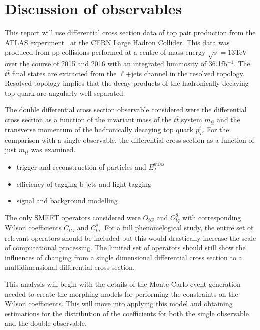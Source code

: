 \documentclass[a4paper,11pt]{article}
\begin{document}
\section{Discussion of observables}
This report will use differential cross section data of top pair production from the ATLAS experiment~\cite{ATLAS:2019hxz} at the CERN Large Hadron Collider.
This data was produced from pp collisions performed at a centre-of-mass energy $\sqrt{s} = 13$TeV over the course of 2015 and 2016 with an integrated luminosity of 36.1fb$^{-1}$.
The $t\bar{t}$ final states are extracted from the $\ell$+jets channel in the resolved topology.
Resolved topology implies that the decay products of the hadronically decaying top quark are angularly well separated.

The double differential cross section observable considered  were the differential cross section as a function of the invariant mass of the $t\bar{t}$ system $m_{t\bar{t}}$ and the transverse momentum of the hadronically decaying top quark $p_{T}^{t}$.
For the comparison with a single observable, the differential cross section as a function of just $m_{t\bar{t}}$ was examined.
\begin{itemize}
    \item trigger and reconstruction of particles and $E_{T}^{miss}$
    \item efficiency of tagging b jets and light tagging
    \item signal and background modelling
\end{itemize}

The only SMEFT operators considered were $O_{tG}$ and $O_{tq}^{8}$ with corresponding Wilson coefficients $C_{tG}$ and $C_{tq}^8$.
For a full phenomelogical study, the entire set of relevant operators should be included but this would drastically increase the scale of computational processing.
The limited set of operators should still show the influences of changing from a single dimensional differential cross section to a multidimensional differential cross section.

This analysis will begin with the details of the Monte Carlo event generation needed to create the morphing models for performing the constraints on the Wilson coefficients.
This will move into applying this model and obtaining estimations for the distribution of the coefficients for both the single observable and the double observable.
\end{document}

